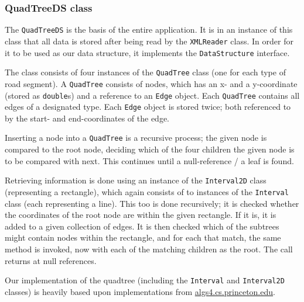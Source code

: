\documentclass[a4paper,11pt]{article}
\begin{document}
\subsubsection{QuadTreeDS class} %
The \texttt{QuadTreeDS} is the basis of the entire application. It is in an instance of this class that all data is stored after being read by the \texttt{XMLReader} class. In order for it to be used as our data structure, it implements the \texttt{DataStructure} interface.

The class consists of four instances of the \texttt{QuadTree} class (one for each type of road segment). A \texttt{QuadTree} consists of nodes, which has an x- and a y-coordinate (stored as \texttt{double}s) and a reference to an \texttt{Edge} object. Each \texttt{QuadTree} contains all edges of a designated type. Each \texttt{Edge} object is stored twice; both referenced to by the start- and end-coordinates of the edge.

Inserting a node into a \texttt{QuadTree} is a recursive process; the given node is compared to the root node, deciding which of the four children the given node is to be compared with next. This continues until a null-reference / a leaf is found.

Retrieving information is done using an instance of the \texttt{Interval2D} class (representing a rectangle), which again consists of to instances of the \texttt{Interval} class (each representing a line). This too is done recursively; it is checked whether the coordinates of the root node are within the given rectangle. If it is, it is added to a given collection of edges. It is then checked which of the subtrees might contain nodes within the rectangle, and for each that match, the same method is invoked, now with each of the matching children as the root. The call returns at null references.

Our implementation of the quadtree (including the \texttt{Interval} and \texttt{Interval2D} classes) is heavily based upon implementations from \url{algs4.cs.princeton.edu}.
\\
\begin{figure}[!h]
\centering
{}
\end{figure}
\\
\end{document}
